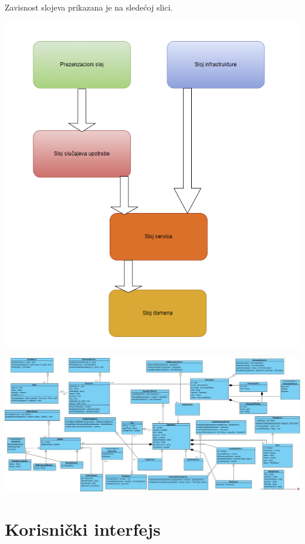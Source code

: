 \documentclass[a4paper]{article}
\begin{document}
Zavisnost slojeva prikazana je na sledećoj slici.


\begin{center}
    \includegraphics[scale=0.5]{Arhitektura/zavisnostSlojeva.png}
\end{center}

\begin{center}
  \includegraphics[scale=0.3, angle=90]{Arhitektura/EvidencijaZaposlenihKlasniDijagram.jpg}
\end{center}

\newpage
\section{Korisnički interfejs}
\end{document}
